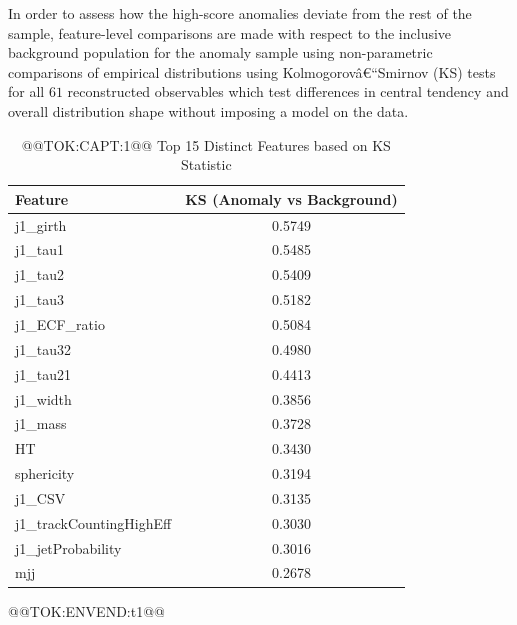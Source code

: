 \documentclass[11pt]{article}
\begin{document}
In order to assess how the high-score anomalies deviate from the rest of the sample, feature-level comparisons are made with respect to the inclusive background population for the anomaly sample using non-parametric comparisons of empirical distributions using Kolmogorovâ€“Smirnov (KS) tests for all $61$ reconstructed observables which test differences in central tendency and overall distribution shape without imposing a model on the data. 

\begin{table}[t]
\centering
\caption{@@TOK:CAPT:1@@ Top 15 Distinct Features based on KS Statistic}
\label{tab:ks_top15}
\renewcommand{\arraystretch}{1.15}
\begin{tabular}{lc}
\hline
\textbf{Feature} & \textbf{KS (Anomaly vs Background)} \\
\hline
j1\_girth                  & 0.5749 \\
j1\_tau1                   & 0.5485 \\
j1\_tau2                   & 0.5409 \\
j1\_tau3                   & 0.5182  \\
j1\_ECF\_ratio              & 0.5084  \\
j1\_tau32                  & 0.4980  \\
j1\_tau21                  & 0.4413  \\
j1\_width                  & 0.3856  \\
j1\_mass                   & 0.3728  \\
HT                          & 0.3430  \\
sphericity                 & 0.3194  \\
j1\_CSV                    & 0.3135  \\
j1\_trackCountingHighEff   & 0.3030  \\
j1\_jetProbability         & 0.3016  \\
mjj                         & 0.2678  \\
\hline
\end{tabular}
@@TOK:ENVEND:t1@@\end{table}
\end{document}
